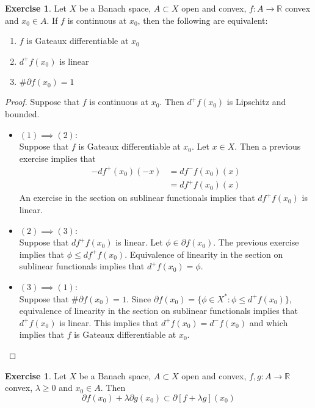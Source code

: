 \documentclass[12pt]{amsart}
\theoremstyle{definition}
\newtheorem{ex}[definition]{Exercise}
\newcommand{\lam}{\lambda}
\newcommand{\R}{\mathbb{R}}
\newcommand{\p}{\partial}
\DeclareMathOperator*{\0}{\mbf{0}}
\DeclareMathOperator*{\1}{\mbf{1}}
\newcommand{\lex}[1]{\label{ex:#1}}
\begin{document}
	\begin{ex} \lex{}
	Let $X$ be a Banach space, $A \subset X$ open and convex, $f:A \rightarrow \R$ convex and $x_0 \in A$. If $f$ is continuous at $x_0$, then the following are equivalent:
	\begin{enumerate}
	\item $f$ is Gateaux differentiable at $x_0$    
	\item $d^+f(x_0)$ is linear 
	\item $\# \p f(x_0) = 1$
	\end{enumerate}
	\end{ex}	
	
	\begin{proof}
	Suppose that $f$ is continuous at $x_0$. Then $d^+f(x_0)$ is Lipschitz and bounded.
	\begin{itemize}
	\item $(1) \implies (2)$: \\ 
	Suppose that $f$ is Gateaux differentiable at $x_0$. Let $x \in X$. Then a previous exercise implies that 
	\begin{align*}
	-df^+(x_0)(-x) 
	&= df^-f(x_0)(x) \\
	&= df^+f(x_0)(x)
	\end{align*}
	An exercise in the section on sublinear functionals implies that $df^+f(x_0)$ is linear.
	\item $(2) \implies (3)$: \\  
	Suppose that $df^+f(x_0)$ is linear. Let $\phi \in \p f(x_0)$. The previous exercise implies that $\phi \leq df^+f(x_0)$. Equivalence of linearity in the section on sublinear functionals implies that $d^+f(x_0) = \phi$. 
	\item $(3) \implies (1)$: \\  
	Suppose that $\# \p f(x_0) = 1$. Since $\p f(x_0) = \{ \phi \in X^*: \phi \leq d^+ f(x_0) \}$, equivalence of linearity in the section on sublinear functionals implies that $d^+ f(x_0)$ is linear. This implies that $d^+ f(x_0) = d^- f(x_0)$ and which implies that $f$ is Gateaux differentiable at $x_0$.
	\end{itemize}
	\end{proof}
	
	\begin{ex}
	Let $X$ be a Banach space, $A \subset X$ open and convex, $f,g:A \rightarrow \R$ convex, $\lam \geq 0$ and $x_0 \in A$. Then $$\p f(x_0) + \lam \p g(x_0) \subset \p[f + \lam g](x_0)$$
	\end{ex}
	
\end{document}
